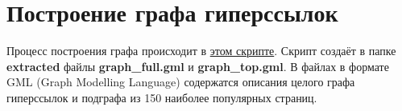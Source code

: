 \section{Построение графа гиперссылок}
Процесс построения графа происходит в \href{https://github.com/vasalf/hse-web-search-homework/blob/master/1/pipeline/graph_builder.py}{этом скрипте}. Скрипт создаёт в папке \textbf{extracted} файлы \textbf{graph\_full.gml} и \textbf{graph\_top.gml}. В файлах в формате GML (Graph Modelling Language) содержатся описания целого графа гиперссылок и подграфа из 150 наиболее популярных страниц.
